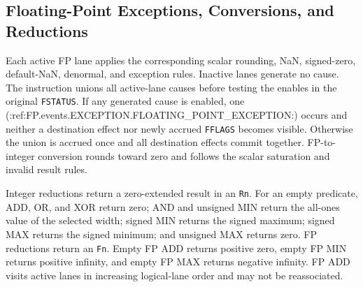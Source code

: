 \subsection{Floating-Point Exceptions, Conversions, and Reductions}

Each active FP lane applies the corresponding scalar rounding, NaN,
signed-zero, default-NaN, denormal, and exception rules.  Inactive lanes
generate no cause.  The instruction unions all active-lane causes before
testing the enables in the original \texttt{FSTATUS}.  If any generated cause
is enabled, one (:ref:FP.events.EXCEPTION.FLOATING_POINT_EXCEPTION:) occurs and neither a destination
effect nor newly accrued \texttt{FFLAGS} becomes visible.  Otherwise the union
is accrued once and all destination effects commit together.  FP-to-integer
conversion rounds toward zero and follows the scalar saturation and invalid
result rules.

Integer reductions return a zero-extended result in an \texttt{Rn}.  For an
empty predicate, ADD, OR, and XOR return zero; AND and unsigned MIN return the
all-ones value of the selected width; signed MIN returns the signed maximum;
signed MAX returns the signed minimum; and unsigned MAX returns zero.  FP
reductions return an \texttt{Fn}.  Empty FP ADD returns positive zero, empty FP
MIN returns positive infinity, and empty FP MAX returns negative infinity.
FP ADD visits active lanes in increasing logical-lane order and may not be
reassociated.

